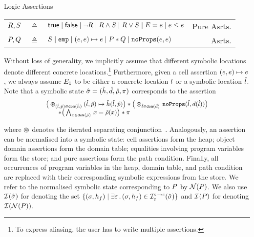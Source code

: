 \vspace{2pt}
\begin{display}{\jsil Logic Assertions}
%
{\small
\begin{tabular}{r@{\ }c@{\ }lr}
  $R, S$ & $\triangleq$ & ${\sf true} \mid {\sf false} \mid  \neg R \mid R \land S \mid R \lor S \mid E = e \mid e \leq e$ & Pure Asrts. \\
  $P, Q$ & $\triangleq$ & $S \mid \texttt{emp} \mid (e, e)\mapsto e \mid P \mathbin{*} Q  \mid \texttt{noProps}(e, e)$ & Asrts. \\
\end{tabular}}
\end{display}

\noindent Without loss of generality, we implicitly assume that different symbolic locations 
denote different concrete locations.\footnote{To express aliasing, the user has to write multiple assertions.}
 Furthermore, given a cell assertion $(e,e) \mapsto e$, we always assume 
 $E_1$ to be either a concrete location $l$ or a symbolic location $\hat{l}$. 
%
Note that 
a symbolic state $\hat{\sigma} = (\hat{h}, \hat{d}, \hat\rho, \pi)$ corresponds to the assertion 
\begin{equation*}
{\small \begin{array}{l}
\big(\varoast_{(\sloc, \sexprp) \in \domain(\sheap)} (\sloc, \sexprp) \mapsto \sheap(\sloc, \sexprp)\big) 
  \sep \big(\varoast_{\sloc \in \domain(\sdom)} \, \emptyfields{\sloc}{\idom(\sloc)}\big)  \\
 \qquad \sep \big(\bigwedge_{\jvar \in \domain(\sstore)} \, \jvar = \sstore(\jvar)\big) \sep \pc
\end{array}}
\end{equation*}

\noindent where $\varoast$ denotes the iterated separating conjunction~\cite{citeme}. 
Analogously, an assertion can be normalised into a symbolic state: 
 cell assertions form the heap; 
object domain assertions form the domain table;
 equalities involving program variables form the store; and 
 pure assertions form the path condition. 
Finally,  all occurrences of program variables in the heap, domain table, and path condition 
are replaced with their corresponding symbolic expressions from the store. 
We refer to the normalised symbolic state corresponding 
to $P$ by $\mathcal{N}(P)$. 
%
We also use $\mathcal{I}^{}_{}(\hat{\sigma})$ for denoting the set 
$\{ (\jstate, \heap_f) \mid \exists \senv \, . \, (\jstate, \heap_f) \in \interpret{\symbconc}{\senv}(\sstate) \}$ 
and $\mathcal{I}^{}_{}(P)$ for denoting $\mathcal{I}^{}_{}(\mathcal{N}(P))$. 

